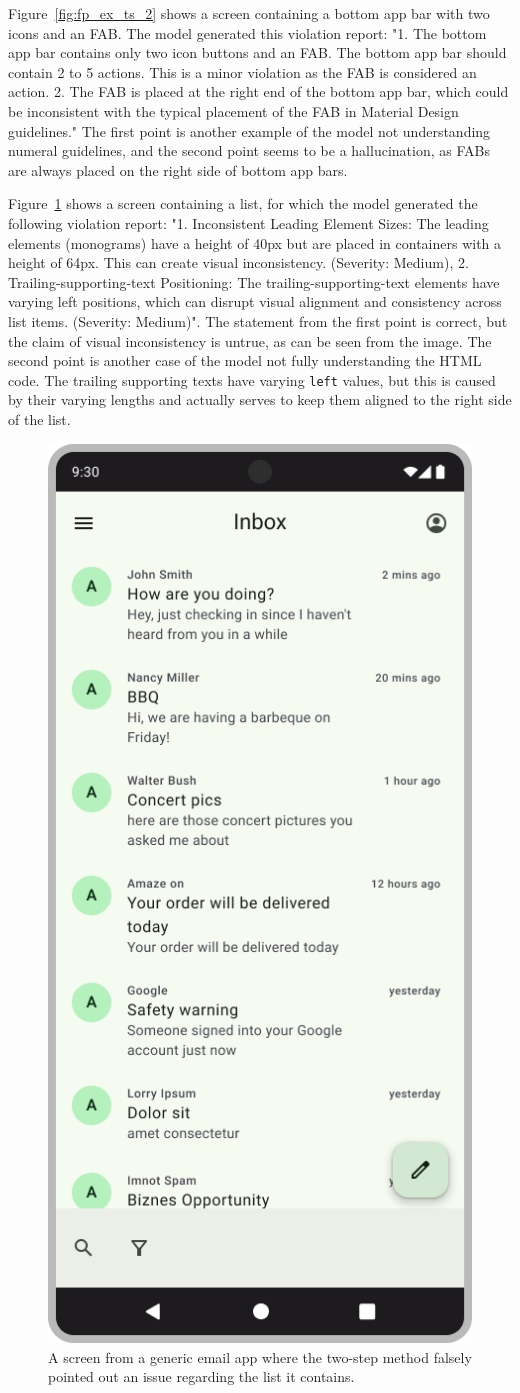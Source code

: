 \documentclass[11pt,titlepage,oneside,openany]{book}
\begin{document}
Figure~\ref{fig:fp_ex_ts_2} shows a screen containing a bottom app bar with two icons and an FAB. The model generated this violation report: "1. The bottom app bar contains only two icon buttons and an FAB. The bottom app bar should contain 2 to 5 actions. This is a minor violation as the FAB is considered an action. 2. The FAB is placed at the right end of the bottom app bar, which could be inconsistent with the typical placement of the FAB in Material Design guidelines." The first point is another example of the model not understanding numeral guidelines, and the second point seems to be a hallucination, as FABs are always placed on the right side of bottom app bars.

Figure~\ref{fig:fp_ex_ts_3} shows a screen containing a list, for which the model generated the following violation report:  "1. Inconsistent Leading Element Sizes: The leading elements (monograms) have a height of 40px but are placed in containers with a height of 64px. This can create visual inconsistency. (Severity: Medium), 2. Trailing-supporting-text Positioning: The trailing-supporting-text elements have varying left positions, which can disrupt visual alignment and consistency across list items. (Severity: Medium)". The statement from the first point is correct, but the claim of visual inconsistency is untrue, as can be seen from the image. The second point is another case of the model not fully understanding the HTML code. The trailing supporting texts have varying \texttt{left} values, but this is caused by their varying lengths and actually serves to keep them aligned to the right side of the list. 

\begin{figure}[H]
	\centering
	\includegraphics[width=.28\textwidth]{figures/fp_ex_ts_3.jpg}
	\caption{A screen from a generic email app where the two-step method falsely pointed out an issue regarding the list it contains.}
	\label{fig:fp_ex_ts_3}
\end{figure}
\end{document}
